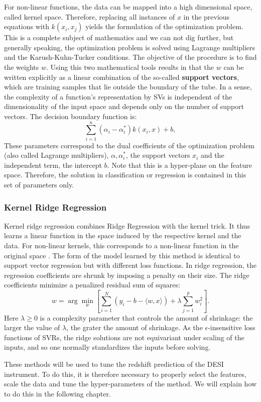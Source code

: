 For non-linear functions, the data can be mapped into a high dimensional space, called kernel space. Therefore, replacing all instances of $x$ in the previous equations with $k(x_i, x_j)$ yields the formulation of the optimization problem. This is a complete subject of mathematics and we can not dig further, but generally speaking, the optimization problem is solved using Lagrange multipliers and the Karush-Kuhn-Tucker conditions. The objective of the procedure is to find the weights $w$. Using this two mathematical tools results in that the $w$ can be written explicitly as a linear combination of the so-called \textbf{support vectors}, which are training samples that lie outside the boundary of the tube. In a sense, the complexity of a function's representation by SVs is independent of the dimensionality of the input space and depends only on the number of support vectors\cite{Hofmann2008}. The decision boundary function is:
\begin{equation}
\sum_{i = 1}^{n} (\alpha_i - \alpha_{i}^{*})k(x_i, x) + b,
\end{equation}
These parameters correspond to the dual coefficients of the optimization problem (also called Lagrange multipliers), $\alpha, \alpha_{i}^{*}$, the support vectors $x_i$ and the independent term, the intercept $b$. Note that this is a hyper-plane on the feature space. Therefore, the solution in classification or regression is contained in this set of parameters only. 
\subsubsection{Kernel Ridge Regression}
Kernel ridge regression combines Ridge Regression with the kernel trick. It thus learns a linear function in the space induced by the respective kernel and the data. For non-linear kernels, this corresponds to a non-linear function in the original space \cite{krr}. The form of the model learned by this method is identical to support vector regression but with different loss functions. In ridge regression, the regression coefficients are shrunk by imposing a penalty on their size. The ridge coefficients minimize a penalized residual sum of squares:
\begin{equation}
w = \arg \min_{w} \left[ \sum_{i = 1}^{N}(y_i - b - \langle w, x\rangle) + \lambda \sum_{j = 1}^{p} w_{i}^{2}\right].
\end{equation}
Here $\lambda \geq 0$ is a complexity parameter that controls the amount of shrinkage: the larger the value of $\lambda$, the grater the amount of shrinkage. As the $\epsilon$-insensitive loss functions of SVRs, the ridge solutions are not equivariant under scaling of the inputs, and so one normally standardizes the inputs before solving. 

These methods will be used to tune the redshift prediction of the DESI instrument. To do this, it is therefore necessary to properly select the features, scale the data and tune the hyper-parameters of the method. We will explain how to do this in the following chapter. 